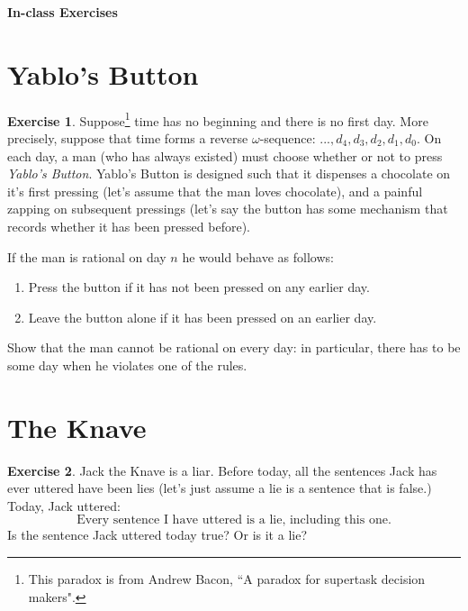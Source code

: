 \documentclass[11pt]{article}
\theoremstyle{definition}
\newtheorem{exer}{Exercise}
\begin{document}




\begin{center}
{\LARGE \bf In-class Exercises}
\end{center}

\smallskip

\section{Yablo's Button}

\begin{exer}
Suppose\footnote{This paradox is from Andrew Bacon, ``A paradox for supertask decision makers".} time has no beginning and there is no first day. More precisely, suppose that time forms a reverse $\omega$-sequence: $..., d_4, d_3, d_2, d_1, d_0$. On each day, a man (who has always existed) must choose whether or not to press \textit{Yablo's Button}. Yablo's Button is designed such that it dispenses a chocolate on it's first pressing (let's assume that the man loves chocolate), and a painful zapping on subsequent pressings (let's say the button has some mechanism that records whether it has been pressed before). 

If the man is rational on day $n$ he would behave as follows:
\begin{enumerate}[\indent(1)]
\item Press the button if it has not been pressed on any earlier day.
\item Leave the button alone if it has been pressed on an earlier day.
\end{enumerate}

Show that the man cannot be rational on every day: in particular, there has to be some day when he violates one of the rules.
\end{exer}

\section{The Knave}

\begin{exer}
Jack the Knave is a liar. Before today, all the sentences Jack has ever uttered have been lies (let's just assume a lie is a sentence that is false.) Today, Jack uttered:
$$\text{Every sentence I have uttered is a lie, including this one.}$$
Is the sentence Jack uttered today true? Or is it a lie?
\end{exer}
\end{document}
